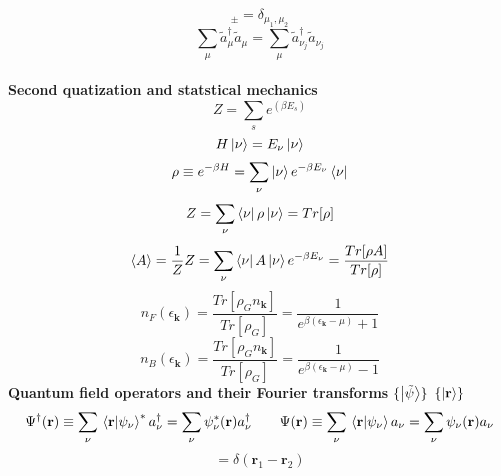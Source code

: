 \documentclass{article}
\begin{document}
\begin{equation*}
    [\tilde{a}_{\mu_1},\tilde{a}^\dagger_{\mu_2}]_{\pm}=\delta_{\mu_1,\mu_2}
\end{equation*}
\begin{equation*}
    \sum_{\mu} \tilde{a}^{\dagger}_{\mu} \tilde{a}_{\mu} = \sum_{\mu} \tilde{a}^{\dagger}_{\nu_j} \tilde{a}_{\nu_j}
\end{equation*}
\\
\textbf{Second quatization and statstical mechanics}
\\
\begin{equation*}
    Z=\sum_{s} e^(\beta E_s)
\end{equation*}
\begin{equation*}
    H\ket{\nu}=E_\nu \ket{\nu}
\end{equation*}
\begin{equation*}
    \rho \equiv e^{-\beta H} = \sum_{\nu} \ket{\nu} e^{-\beta E_\nu} \bra{\nu}
\end{equation*}
\begin{equation*}
    Z=\sum_\nu \bra{\nu} \rho \ket{\nu} = Tr[\rho]
\end{equation*}
\begin{equation*}
    \left < A \right > =\frac{1}{Z}Z=\sum_\nu \bra{\nu} A \ket{\nu} e^{-\beta E_\nu} = \frac{Tr[\rho A]}{Tr[\rho]}
\end{equation*}
\begin{equation*}
    n_F(\epsilon_{\textbf{k}}) = \frac{Tr[\rho_G n_\textbf{k}]}{Tr[\rho_G]} = \frac{1}{e^{\beta(\epsilon_{\textbf{k}}-\mu)}+1}
\end{equation*}
\begin{equation*}
    n_B(\epsilon_{\textbf{k}}) = \frac{Tr[\rho_G n_\textbf{k}]}{Tr[\rho_G]} = \frac{1}{e^{\beta(\epsilon_{\textbf{k}}-\mu)}-1}
\end{equation*}
\textbf{Quantum field operators and their Fourier transforms}
$\{ \ket{\tilde{\psi}}\}$
$\{ \ket{\textbf{r}}\} $
\begin{equation*}
    \Psi^\dagger(\textbf{r}) \equiv \sum_\nu \braket*{\textbf{r}}{\psi_\nu}^{*} a^\dagger_\nu = \sum_\nu \psi^{*}_\nu(\textbf{r})a^\dagger_\nu \qquad \Psi(\textbf{r}) \equiv \sum_\nu \braket*{\textbf{r}}{\psi_\nu} a_\nu = \sum_\nu \psi_\nu(\textbf{r}) a_\nu
\end{equation*}
\begin{equation*}
    [\Psi(\textbf{r}_1),\Psi^\dagger(\textbf{r}_2)] = \delta(\textbf{r}_1-\textbf{r}_2)
\end{equation*}
\end{document}
